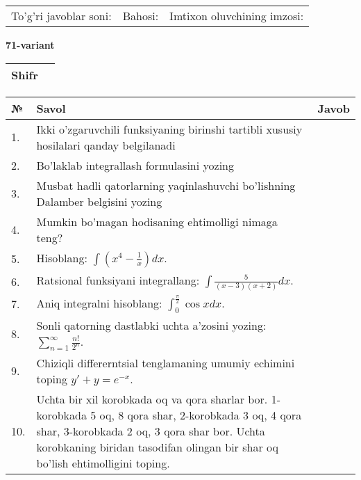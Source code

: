 \documentclass{article}
\begin{document}
  \vspace{1cm}
  
  \begin{tabular}{lll}
  To'g'ri javoblar soni: \underline{\hspace{1.5cm}} & 
  Bahosi: \underline{\hspace{1.5cm}} & 
  Imtixon oluvchining imzosi: \underline{\hspace{2cm}} \\
  \end{tabular}
  
  \egroup
  
  \newpage
  
  
  \textbf{71-variant}\\
  
  \bgroup
  \def\arraystretch{1.6} %
  
  \begin{tabular}{|m{5.7cm}|m{9.5cm}|}
  \hline
  Shifr & \\
  \hline
  \end{tabular}
  
  \vspace{1cm}
  
  \begin{tabular}{|m{0.7cm}|m{10cm}|m{4cm}|}
  \hline
  № & Savol & Javob \\
  \hline
  1. & Ikki o'zgaruvchili funksiyaning birinshi tartibli xususiy hosilalari qanday belgilanadi &  \\
  \hline
  2. & Bo'laklab integrallash formulasini yozing &  \\
  \hline
  3. & Musbat hadli qatorlarning yaqinlashuvchi bo'lishning Dalamber belgisini yozing &  \\
  \hline
  4. & Mumkin bo'magan hodisaning ehtimolligi nimaga teng? &  \\
  \hline
  5. & Hisoblang: \(\int \left( x^{4} - \frac{1}{x} \right)dx\). &  \\
  \hline
  6. & Ratsional funksiyani integrallang: \(\int {\frac{5}{(x - 3)(x + 2)}dx}\). &  \\
  \hline
  7. & Aniq integralni hisoblang: \(\int_{0}^{\frac{\pi}{2}}{\cos xdx}\). &  \\
  \hline
  8. & Sonli qatorning dastlabki uchta a'zosini yozing: \(\sum_{n = 1}^{\infty}\frac{n!}{2^{n}}\). &  \\
  \hline
  9. & Chiziqli differerntsial tenglamaning umumiy echimini toping \(y' + y = e^{- x}\). &  \\
  \hline
  10. & Uchta bir xil korobkada oq va qora sharlar bor. 1-korobkada 5 oq, 8 qora shar, 2-korobkada 3 oq, 4 qora shar, 3-korobkada 2 oq, 3 qora shar bor. Uchta korobkaning biridan tasodifan olingan bir shar oq bo'lish ehtimolligini toping. &  \\
  \hline
  \end{tabular}
  
\end{document}
